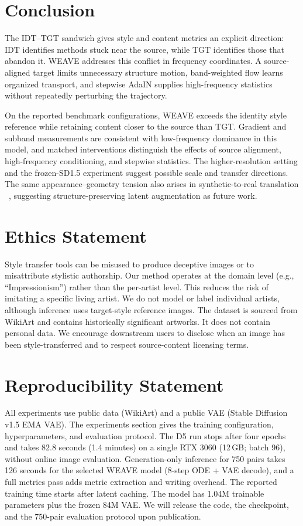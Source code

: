 \documentclass[letterpaper]{article}
\begin{document}
\section{Conclusion}

The IDT--TGT sandwich gives style and content metrics an explicit direction: IDT identifies
methods stuck near the source, while TGT identifies those that abandon it. WEAVE addresses
this conflict in frequency coordinates. A source-aligned target limits unnecessary structure
motion, band-weighted flow learns organized transport, and stepwise AdaIN supplies
high-frequency statistics without repeatedly perturbing the trajectory.

On the reported benchmark configurations, WEAVE exceeds the identity style reference while
retaining content closer to the source than TGT. Gradient and subband measurements are
consistent with low-frequency dominance in this model, and matched interventions distinguish
the effects of source alignment, high-frequency conditioning, and stepwise statistics.
The higher-resolution setting and the frozen-SD1.5 experiment suggest possible scale and
transfer directions.
The same appearance--geometry tension also arises in synthetic-to-real translation
~\cite{zang2026fddb}, suggesting structure-preserving latent augmentation as future work.

\section*{Ethics Statement}
Style transfer tools can be misused to produce deceptive images or to misattribute stylistic authorship.
Our method operates at the domain level (e.g., ``Impressionism'') rather than the per-artist level.
This reduces the risk of imitating a specific living artist.
We do not model or label individual artists, although inference uses target-style reference images.
The dataset is sourced from WikiArt and contains historically significant artworks.
It does not contain personal data.
We encourage downstream users to disclose when an image has been style-transferred and to respect source-content licensing terms.

\section*{Reproducibility Statement}
All experiments use public data (WikiArt) and a public VAE (Stable Diffusion v1.5 EMA VAE).
The experiments section gives the training configuration, hyperparameters, and evaluation protocol.
The D5 run stops after four epochs and takes 82.8 seconds (1.4 minutes) on a single RTX 3060 (12\,GB; batch 96), without online image evaluation.
Generation-only inference for 750 pairs takes 126 seconds for the selected WEAVE model (8-step ODE + VAE decode), and a full metrics pass adds metric extraction and writing overhead. The reported training time starts after latent caching.
The model has 1.04M trainable parameters plus the frozen 84M VAE.
We will release the code, the checkpoint, and the 750-pair evaluation protocol upon publication.


\end{document}
